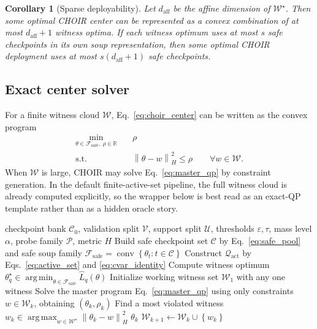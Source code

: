 \documentclass{article}
\newtheorem{corollary}{Corollary}
\newcommand{\RR}{\mathbb{R}}
\newcommand{\cC}{\mathcal{C}}
\newcommand{\cF}{\mathcal{F}}
\newcommand{\cP}{\mathcal{P}}
\newcommand{\cQ}{\mathcal{Q}}
\newcommand{\cU}{\mathcal{U}}
\newcommand{\cV}{\mathcal{V}}
\newcommand{\cW}{\mathcal{W}}
\newcommand{\argmin}{\operatorname*{arg\,min}}
\newcommand{\argmax}{\operatorname*{arg\,max}}
\newcommand{\aff}{\mathrm{aff}}
\newcommand{\conv}{\operatorname{conv}}
\newcommand{\choir}{\textup{\textsc{CHOIR}}}
\newcommand{\norm}[1]{\left\lVert #1 \right\rVert}
\newcommand{\braces}[1]{\left\{ #1 \right\}}
\newcommand{\safe}{\mathrm{safe}}
\newcommand{\act}{\mathrm{act}}
\begin{document}
\begin{corollary}[Sparse deployability]
\label{cor:sparse}
Let \(d_{\aff}\) be the affine dimension of \(\cW^\star\). Then some optimal \choir{} center can be represented as a convex combination of at most \(d_{\aff}+1\) witness optima. If each witness optimum uses at most \(s\) safe checkpoints in its own soup representation, then some optimal \choir{} deployment uses at most \(s(d_{\aff}+1)\) safe checkpoints.
\end{corollary}

\subsection{Exact center solver}

For a finite witness cloud \(\cW\), Eq.~\eqref{eq:choir_center} can be written as the convex program
\begin{equation}
\begin{aligned}
\min_{\theta\in\cF_{\safe},\ \rho\in\RR}\quad & \rho \\
\text{s.t.}\quad &
\norm{\theta-w}_H^2 \le \rho
\qquad \forall w\in\cW.
\end{aligned}
\label{eq:master_qp}
\end{equation}
When \(\cW\) is large, \choir{} may solve Eq.~\eqref{eq:master_qp} by constraint generation. In the default finite-active-set pipeline, the full witness cloud is already computed explicitly, so the wrapper below is best read as an exact-QP template rather than as a hidden oracle story.

\begin{algorithm}[t]
\caption{\choir{} with probe-induced active reweightings}
\label{alg:choir}
\begin{algorithmic}[1]
\Require checkpoint bank \(\cC_0\), validation split \(\cV\), support split \(\cU\), thresholds \(\varepsilon,\tau\), mass level \(\alpha\), probe family \(\cP\), metric \(H\)
\State Build safe checkpoint set \(\cC\) by Eq.~\eqref{eq:safe_pool} and safe soup family \(\cF_{\safe}=\conv\braces{\theta_t:t\in\cC}\)
\State Construct \(\cQ_{\act}\) by Eqs.~\eqref{eq:active_set} and \eqref{eq:cvar_identity}
\ForAll{\(q\in\cQ_{\act}\)}
    \State Compute witness optimum \(\theta_q^\star \in \argmin_{\theta\in\cF_{\safe}} \widehat L_q(\theta)\)
\EndFor
\State Initialize working witness set \(\cW_1\) with any one witness
    \State Solve the master program Eq.~\eqref{eq:master_qp} using only constraints \(w\in\cW_k\), obtaining \((\theta_k,\rho_k)\)
    \State Find a most violated witness \(w_k \in \argmax_{w\in\cW^\star}\norm{\theta_k-w}_H^2\)
    \If{\(\norm{\theta_k-w_k}_H^2 \le \rho_k\)}
        \State \Return \(\theta_k\)
    \Else
        \State \(\cW_{k+1}\gets \cW_k \cup \braces{w_k}\)
    \EndIf
\EndFor
\end{algorithmic}
\end{algorithm}
\end{document}
